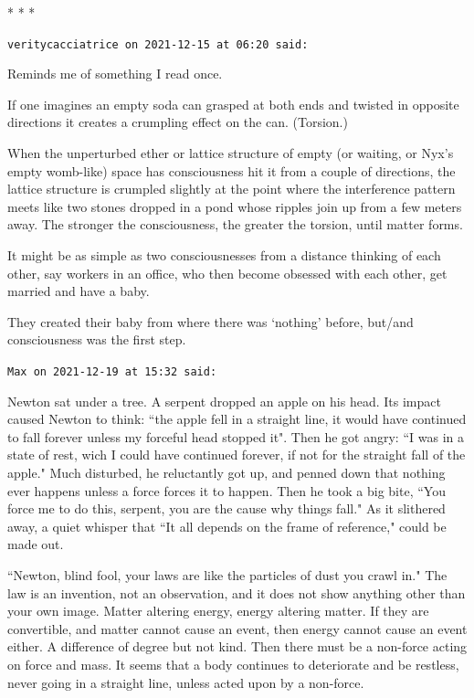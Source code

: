 
\begin{center}* * *\end{center}

\begin{footnotesize}\begin{sffamily}



\texttt{veritycacciatrice on 2021-12-15 at 06:20 said: }

Reminds me of something I read once.

If one imagines an empty soda can grasped at both ends and twisted in opposite directions it creates a crumpling effect on the can. (Torsion.)

When the unperturbed ether or lattice structure of empty (or waiting, or Nyx's empty womb-like) space has consciousness hit it from a couple of directions, the lattice structure is crumpled slightly at the point where the interference pattern meets like two stones dropped in a pond whose ripples join up from a few meters away. The stronger the consciousness, the greater the torsion, until matter forms.

It might be as simple as two consciousnesses from a distance thinking of each other, say workers in an office, who then become obsessed with each other, get married and have a baby.

They created their baby from where there was `nothing' before, but/and consciousness was the first step.


\hfill

\texttt{Max on 2021-12-19 at 15:32 said: }

Newton sat under a tree. A serpent dropped an apple on his head. Its impact caused Newton to think: ``the apple fell in a straight line, it would have continued to fall forever unless my forceful head stopped it". Then he got angry: ``I was in a state of rest, wich I could have continued forever, if not for the straight fall of the apple." Much disturbed, he reluctantly got up, and penned down that nothing ever happens unless a force forces it to happen. Then he took a big bite, ``You force me to do this, serpent, you are the cause why things fall." As it slithered away, a quiet whisper that ``It all depends on the frame of reference," could be made out.

``Newton, blind fool, your laws are like the particles of dust you crawl in." The law is an invention, not an observation, and it does not show anything other than your own image. Matter altering energy, energy altering matter. If they are convertible, and matter cannot cause an event, then energy cannot cause an event either. A difference of degree but not kind. Then there must be a non-force acting on force and mass. It seems that a body continues to deteriorate and be restless, never going in a straight line, unless acted upon by a non-force.


\end{sffamily}
\end{footnotesize}
